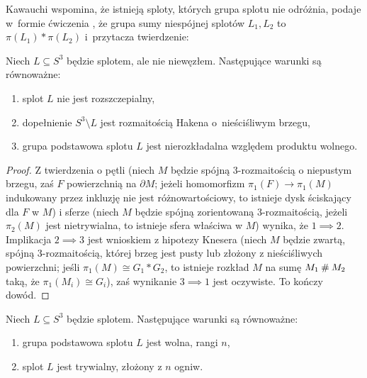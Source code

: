 Kawauchi wspomina, że istnieją sploty, których grupa splotu nie odróżnia, podaje w~formie ćwiczenia \cite[s. 73]{kawauchi1996}, że grupa sumy niespójnej splotów $L_1, L_2$ to $\pi(L_1) * \pi(L_2)$ i~przytacza twierdzenie:

\begin{proposition}
    Niech $L \subseteq S^3$ będzie splotem, ale nie niewęzłem.
    Następujące warunki są równoważne:
    \begin{enumerate}
        \item splot $L$ nie jest rozszczepialny,
%
        \item dopełnienie $S^3 
        \setminus L$ jest rozmaitością Hakena o~nieściśliwym brzegu,
%
        \item grupa podstawowa splotu $L$ jest nierozkładalna względem produktu wolnego.
    \end{enumerate}
\end{proposition}

\begin{proof}
    Z twierdzenia o pętli (niech $M$ będzie spójną 3-rozmaitością o niepustym brzegu, zaś $F$ powierzchnią na $\partial M$; jeżeli homomorfizm $\pi_1(F) \to \pi_1(M)$ indukowany przez inkluzję nie jest różnowartościowy, to istnieje dysk ściskający dla $F$ w $M$) i sferze (niech $M$ będzie spójną zorientowaną 3-rozmaitością, jeżeli $\pi_2(M)$ jest nietrywialna, to istnieje sfera właściwa w $M$) wynika, że $1 \implies 2$.
    Implikacja $2 \implies 3$ jest wnioskiem z hipotezy Knesera (niech $M$ będzie zwartą, spójną 3-rozmaitością, której brzeg jest pusty lub złożony z nieściśliwych powierzchni; jeśli $\pi_1(M) \cong G_1 * G_2$, to istnieje rozkład $M$ na sumę $M_1 \mathbin{\#} M_2$ taką, że $\pi_1(M_i) \cong G_i$), zaś wynikanie $3 \implies 1$ jest oczywiste.
%
%
%
    To kończy dowód.
\end{proof}

\begin{corollary}
    Niech $L \subseteq S^3$ będzie splotem.
    Następujące warunki są równoważne:
    \begin{enumerate}
        \item grupa podstawowa splotu $L$ jest wolna, rangi $n$,
        \item splot $L$ jest trywialny, złożony z $n$ ogniw.
    \end{enumerate}
\end{corollary}


